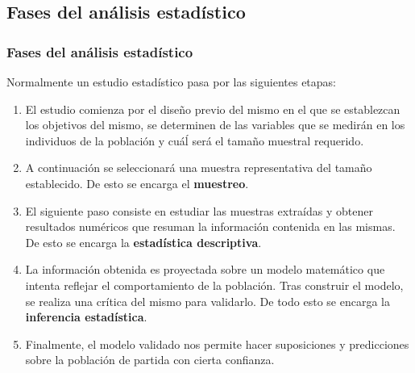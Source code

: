 \subsection{Fases del análisis estadístico}

\begin{frame}
\frametitle{Fases del análisis estadístico}
Normalmente un estudio estadístico pasa por las siguientes etapas:
\begin{enumerate}
\item El estudio comienza por el diseño previo del mismo en el que se establezcan los objetivos del mismo, se determinen
de las variables que se medirán en los individuos de la población y cuáĺ será el tamaño muestral requerido.
\item A continuación se seleccionará una muestra representativa del tamaño establecido. De esto se encarga el
\textbf{muestreo}.
\item El siguiente paso consiste en estudiar las muestras extraídas y obtener resultados numéricos que resuman la información contenida en las mismas. De esto se encarga la \textbf{estadística descriptiva}.
\item La información obtenida es proyectada sobre un modelo matemático que intenta reflejar el comportamiento de la población. Tras construir el modelo, se realiza una crítica del mismo para validarlo. De todo esto se encarga la \textbf{inferencia estadística}.
\item Finalmente, el modelo validado nos permite hacer suposiciones y predicciones sobre la población de partida con cierta confianza.
\end{enumerate}
\end{frame}


